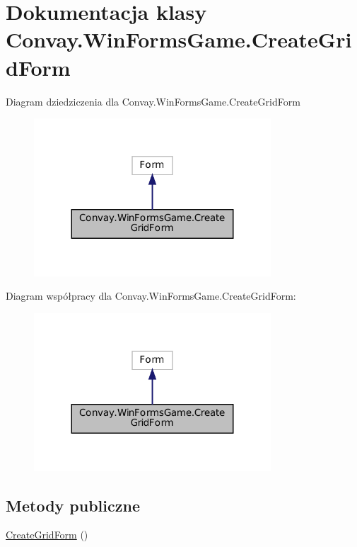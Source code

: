 \hypertarget{class_convay_1_1_win_forms_game_1_1_create_grid_form}{}\section{Dokumentacja klasy Convay.\+Win\+Forms\+Game.\+Create\+Grid\+Form}
\label{class_convay_1_1_win_forms_game_1_1_create_grid_form}


Diagram dziedziczenia dla Convay.\+Win\+Forms\+Game.\+Create\+Grid\+Form
\nopagebreak
\begin{figure}[H]
\begin{center}
\leavevmode
\includegraphics[width=251pt]{class_convay_1_1_win_forms_game_1_1_create_grid_form__inherit__graph}
\end{center}
\end{figure}


Diagram współpracy dla Convay.\+Win\+Forms\+Game.\+Create\+Grid\+Form\+:
\nopagebreak
\begin{figure}[H]
\begin{center}
\leavevmode
\includegraphics[width=251pt]{class_convay_1_1_win_forms_game_1_1_create_grid_form__coll__graph}
\end{center}
\end{figure}
\subsection*{Metody publiczne}
\begin{DoxyCompactItemize}
\item 
\hyperlink{class_convay_1_1_win_forms_game_1_1_create_grid_form_aeaac1fac90b8f649ad0f8c83cd77248c}{Create\+Grid\+Form} ()
\end{DoxyCompactItemize}
